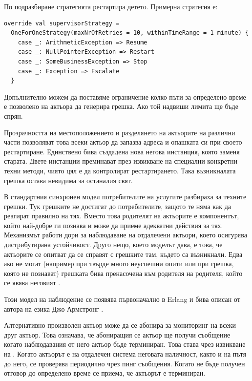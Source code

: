 По подразбиране стратегията рестартира детето. Примерна стратегия е:

\begin{lstlisting}
override val supervisorStrategy =
  OneForOneStrategy(maxNrOfRetries = 10, withinTimeRange = 1 minute) {
    case _: ArithmeticException => Resume
    case _: NullPointerException => Restart
    case _: SomeBusinessException => Stop
    case _: Exception => Escalate
  }
\end{lstlisting}

Допълнително можем да поставяме ограничение колко пъти за определено време е позволено на актьора да генерира грешка. Ако той надвиши лимита ще бъде спрян.

Прозрачността на местоположението и разделянето на актьорите на различни части позволяват това всеки актьор да запазва адреса и опашката си при своето рестартиране. Единствено бива създадена нова негова инстанция, която заменя старата. Двете инстанции преминават през извикване на специални конкретни техни методи, чиято цял е да контролират рестартирането. Така възникналата грешка остава невидима за останалия свят.

В стандартния синхронен модел потребителите на услугите разбираха за техните грешки. Тук грешките не достигат до потребителите, защото те няма как да реагират правилно на тях. Вместо това родителят на актьорите е компонентът, който най-добре ги познава и може да приеме адекватни действия за тях. Механизмът работи дори за наблюдаване на отдалечени актьори, което осигурява дистрибутирана устойчивост. Друго нещо, което моделът дава, е това, че актьорите се опитват да се справят с грешките там, където са възникнали. Едва ако не могат (например при твърде много неуспешни опити или при грешка, която не познават) грешката бива пренасочена към родителя на родителя, който се явява неговият .

Този модел на наблюдение се появява първоначално в Erlang и бива описан от автора на езика Джо Армстронг \cite{armstrong2003ReliableDistributedSystems}.

Алтернативно произволен актьор може да се абонира за мониторинг на всеки друг актьор. Това означава, че абониращия се актьор ще получи съобщение когато наблюдавания от него актьор бъде терминиран. Това става чрез извикване на . Когато актьорът е на отдалечен система неговата наличност, както и на пътя до него, се проверява периодично чрез пинг съобщения. Когато не бъде получен отговор до определено време се приема, че актьорът е терминиран.

